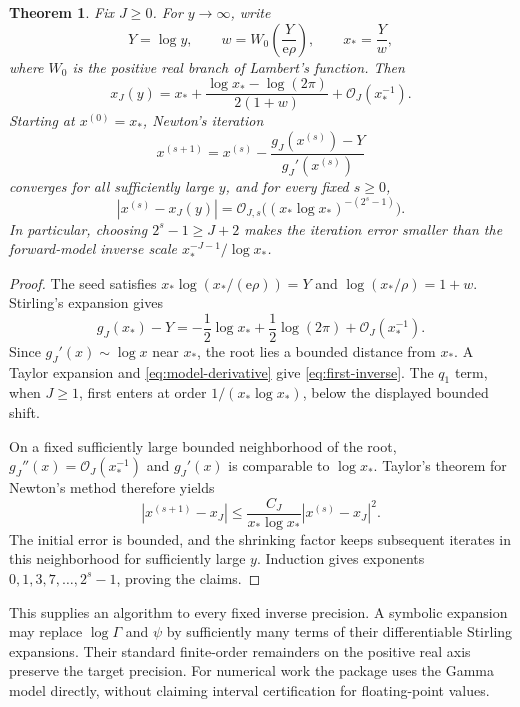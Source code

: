 \documentclass[11pt,letterpaper]{article}
\numberwithin{equation}{section}
\newtheorem{theorem}{Theorem}[section]
\theoremstyle{remark}\newtheorem{remark}[theorem]{Remark}
\newcommand{\e}{\mathrm e}
\newcommand{\Ord}{\mathcal O}
\begin{document}
\begin{theorem}\label{thm:inverse}
Fix $J\ge0$. For $y\to\infty$, write
\begin{equation}\label{eq:seed}
 Y=\log y,\qquad w=W_0\left(\frac{Y}{\e\rho}\right),
 \qquad x_*=\frac{Y}{w},
\end{equation}
where $W_0$ is the positive real branch of Lambert's function. Then
\begin{equation}\label{eq:first-inverse}
 x_J(y)=x_*+\frac{\log x_*-\log(2\pi)}{2(1+w)}
                         +\Ord_J(x_*^{-1}).
\end{equation}
Starting at $x^{(0)}=x_*$, Newton's iteration
\begin{equation}\label{eq:newton}
 x^{(s+1)}=x^{(s)}-
     \frac{g_J(x^{(s)})-Y}{g_J'(x^{(s)})}
\end{equation}
converges for all sufficiently large $y$, and for every fixed $s\ge0$,
\begin{equation}\label{eq:newton-error}
 |x^{(s)}-x_J(y)|
   =\Ord_{J,s}\bigl((x_*\log x_*)^{-(2^s-1)}\bigr).
\end{equation}
In particular, choosing $2^s-1\ge J+2$ makes the iteration error smaller than the forward-model inverse scale $x_*^{-J-1}/\log x_*$.
\end{theorem}
\begin{proof}
The seed satisfies $x_*\log(x_*/(\e\rho))=Y$ and $\log(x_*/\rho)=1+w$. Stirling's expansion gives
\[
 g_J(x_*)-Y=-\frac12\log x_*+\frac12\log(2\pi)
                                      +\Ord_J(x_*^{-1}).
\]
Since $g_J'(x)\sim\log x$ near $x_*$, the root lies a bounded distance from $x_*$. A Taylor expansion and \eqref{eq:model-derivative} give \eqref{eq:first-inverse}. The $q_1$ term, when $J\ge1$, first enters at order $1/(x_*\log x_*)$, below the displayed bounded shift.

On a fixed sufficiently large bounded neighborhood of the root,
$g_J''(x)=\Ord_J(x_*^{-1})$ and $g_J'(x)$ is comparable to $\log x_*$. Taylor's theorem for Newton's method therefore yields
\[
 |x^{(s+1)}-x_J|
 \le\frac{C_J}{x_*\log x_*}|x^{(s)}-x_J|^2.
\]
The initial error is bounded, and the shrinking factor keeps subsequent iterates in this neighborhood for sufficiently large $y$. Induction gives exponents $0,1,3,7,\ldots,2^s-1$, proving the claims.
\end{proof}

This supplies an algorithm to every fixed inverse precision. A symbolic expansion may replace $\log\Gamma$ and $\psi$ by sufficiently many terms of their differentiable Stirling expansions. Their standard finite-order remainders on the positive real axis preserve the target precision. For numerical work the package uses the Gamma model directly, without claiming interval certification for floating-point values.
\end{document}
